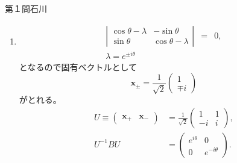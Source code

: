 \begin{answer}{第１問}{石川}
\begin{enumerate}
\item
  \begin{eqnarray}
  \left|
    \begin{array}{cc}
     \cos\theta-\lambda & -\sin\theta \\
     \sin\theta  & \cos\theta-\lambda 
    \end{array}
   \right| &=& 0,\\
   \lambda = e^{\pm i \theta}
  \end{eqnarray}
  となるので固有ベクトルとして\\
  \begin{equation}
    \bm{x}_{\pm}=\frac{1}{\sqrt{2}}\left(
      \begin{array}{c}
        1 \\
        \mp i  
      \end{array}
    \right)
  \end{equation}
  がとれる。\\
  \begin{align}
    U \equiv \left(
      \begin{array}{cc}
        \bm{x}_{+}  & \bm{x}_{-} 
      \end{array}
    \right) &= \frac{1}{\sqrt{2}}\left(
      \begin{array}{cc}
       1 & 1 \\
       -i  & i 
      \end{array}
    \right),\\
    U^{-1}BU &= \left(
      \begin{array}{cc}
        e^{i\theta} & 0 \\
        0 & e^{-i\theta} 
      \end{array}
    \right).
  \end{align}


\end{enumerate}
\end{answer}
